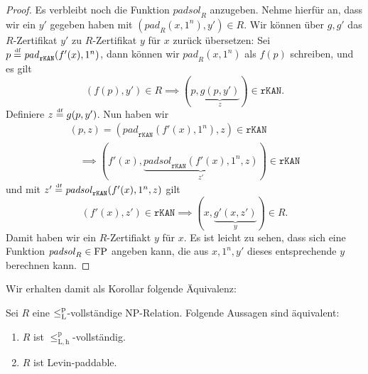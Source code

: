 \begin{proof}
    Es verbleibt noch die Funktion $\mathit{padsol}_R$ anzugeben. Nehme hierfür an, dass wir ein $y'$ gegeben haben mit $(\mathit{pad}_R(x, 1^n), y')\in R$.
    Wir können über $g, g'$ das $R$-Zertifikat $y'$ zu $R$-Zertifikat $y$ für $x$ zurück übersetzen:
    Sei $p\stackrel{\text{{\normalfont\tiny df}}}{=} \mathit{pad}_\mathtt{rKAN}(f'(x), 1^n)$, dann können wir $\mathit{pad}_R(x, 1^n)$ als $f(p)$ schreiben, und es gilt
    \[ (f(p), y')\in R \implies (p, \underbrace{g(p, y')}_z)\in \mathtt{rKAN}. \]
    Definiere $z\stackrel{\text{{\normalfont\tiny df}}}{=} g(p, y')$.
    Nun haben wir
    \begin{gather*} (p, z)=(\mathit{pad}_\mathtt{rKAN}(f'(x), 1^n), z)\in\mathtt{rKAN}  \\\quad\implies (f'(x), \underbrace{\mathit{padsol}_\mathtt{rKAN}(f'(x), 1^n, z)}_{z'})\in\mathtt{rKAN} \end{gather*}
    und mit $z'\stackrel{\text{{\normalfont\tiny df}}}{=} \mathit{padsol}_\mathtt{rKAN}(f'(x), 1^n, z)$ gilt
    \[ (f'(x), z') \in \mathtt{rKAN} \implies (x, \underbrace{g'(x, z')}_{y}) \in R. \]
    Damit haben wir ein $R$-Zertifiakt $y$ für $x$.
    Es ist leicht zu sehen, dass sich eine Funktion $\mathit{padsol}_R\in\mathrm{FP}$ angeben kann, die aus $x, 1^n, y'$ dieses entsprechende $y$ berechnen kann.
\end{proof}

Wir erhalten damit als Korollar folgende Äquivalenz:
\begin{corollary}\label{cor:leqlhp-is-paddable}
    Sei $R$ eine $\leq_\mathrm{L}^\mathrm{p}$-vollständige NP-Relation. Folgende Aussagen sind äquivalent:
    \begin{enumerate}
        \item $R$ ist $\leq_\mathrm{L,h}^\mathrm p$-vollständig.
        \item $R$ ist Levin-paddable.
    \end{enumerate}
\end{corollary}

